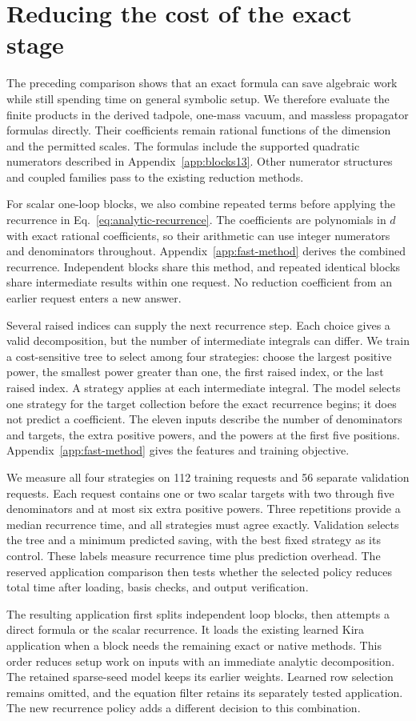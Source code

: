 \section{Reducing the cost of the exact stage}
\label{sec:fast-method}
The preceding comparison shows that an exact formula can save algebraic work while still spending time on general symbolic setup. We therefore evaluate the finite products in the derived tadpole, one-mass vacuum, and massless propagator formulas directly. Their coefficients remain rational functions of the dimension and the permitted scales. The formulas include the supported quadratic numerators described in Appendix~\ref{app:blocks13}. Other numerator structures and coupled families pass to the existing reduction methods.

For scalar one-loop blocks, we also combine repeated terms before applying the recurrence in Eq.~\eqref{eq:analytic-recurrence}. The coefficients are polynomials in $d$ with exact rational coefficients, so their arithmetic can use integer numerators and denominators throughout. Appendix~\ref{app:fast-method} derives the combined recurrence. Independent blocks share this method, and repeated identical blocks share intermediate results within one request. No reduction coefficient from an earlier request enters a new answer.

Several raised indices can supply the next recurrence step. Each choice gives a valid decomposition, but the number of intermediate integrals can differ. We train a cost-sensitive tree to select among four strategies: choose the largest positive power, the smallest power greater than one, the first raised index, or the last raised index. A strategy applies at each intermediate integral. The model selects one strategy for the target collection before the exact recurrence begins; it does not predict a coefficient. The eleven inputs describe the number of denominators and targets, the extra positive powers, and the powers at the first five positions. Appendix~\ref{app:fast-method} gives the features and training objective.

We measure all four strategies on 112 training requests and 56 separate validation requests. Each request contains one or two scalar targets with two through five denominators and at most six extra positive powers. Three repetitions provide a median recurrence time, and all strategies must agree exactly. Validation selects the tree and a minimum predicted saving, with the best fixed strategy as its control. These labels measure recurrence time plus prediction overhead. The reserved application comparison then tests whether the selected policy reduces total time after loading, basis checks, and output verification.

The resulting application first splits independent loop blocks, then attempts a direct formula or the scalar recurrence. It loads the existing learned Kira application when a block needs the remaining exact or native methods. This order reduces setup work on inputs with an immediate analytic decomposition. The retained sparse-seed model keeps its earlier weights. Learned row selection remains omitted, and the equation filter retains its separately tested application. The new recurrence policy adds a different decision to this combination.
